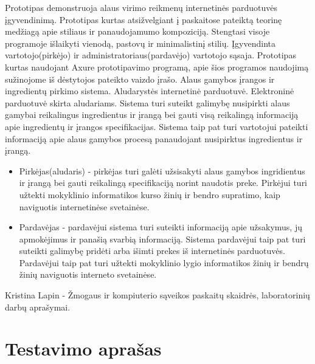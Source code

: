 \documentclass[oneside]{VUMIFPSkursinis}
\begin{document}
		Prototipas demonstruoja alaus virimo reikmenų internetinės parduotuvės įgyvendinimą. Prototipas kurtas atsižvelgiant į paskaitose pateiktą teorinę medžiagą apie stiliaus ir panaudojamumo kompoziciją. Stengtasi visoje programoje išlaikyti vienodą, pastovų ir minimalistinį stilių. Įgyvendinta vartotojo(pirkėjo) ir administratoriaus(pardavėjo) vartotojo sąsaja. Prototipas kurtas naudojant Axure prototipavimo programą, apie šios programos naudojimą sužinojome iš dėstytojos pateikto vaizdo įrašo.
		Alaus gamybos įrangos ir ingredientų pirkimo sistema.
		Aludarystės internetinė parduotuvė.
		Elektroninė parduotuvė skirta aludariams.
		Sistema turi suteikt galimybę nusipirkti alaus gamybai reikalingus ingredientus ir įrangą bei gauti visą reikalingą informaciją apie ingredientų ir įrangos specifikacijas.
		Sistema taip pat turi vartotojui pateikti informaciją apie alaus gamybos procesą panaudojant nusipirktus ingredientus ir įrangą.
		\begin{itemize}
			\item{Pirkėjas(aludaris) - pirkėjas turi galėti užsisakyti alaus gamybos ingridientus ir įrangą bei gauti reikalingą specifikaciją norint naudotis preke.
				Pirkėjui turi užtekti mokyklinio informatikos kurso žinių ir bendro supratimo, kaip naviguotis internetinėse svetainėse.}
			\item{Pardavėjas - pardavėjui sistema turi suteikti informaciją apie užsakymus, jų apmokėjimus ir panašią svarbią informaciją.
				Sistema pardavėjui taip pat turi suteikti galimybę pridėti arba išimti prekes iš internetinės parduotuvės.
				Pardavėjui taip pat turi užtekti mokyklinio lygio informatikos žinių ir bendrų žinių naviguotis interneto svetainėse.}
		\end{itemize}
		Kristina Lapin - Žmogaus ir kompiuterio sąveikos paskaitų skaidrės, laboratorinių darbų aprašymai.
	

\section{Testavimo aprašas}
\end{document}
